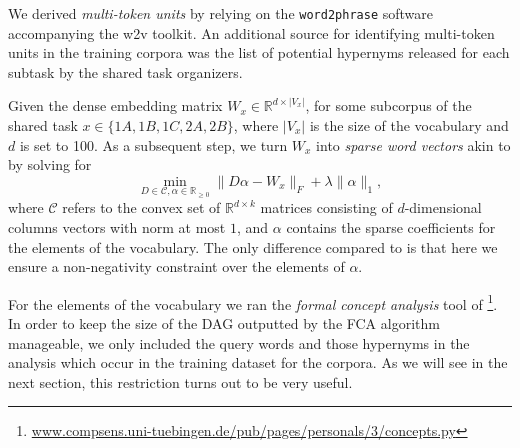 \documentclass[11pt,a4paper]{article}
\begin{document}
We derived \emph{multi-token units} by relying on the \texttt{word2phrase} 
software accompanying the w2v toolkit. An additional source for identifying 
multi-token units in the training corpora was the list of potential hypernyms 
released for each subtask by the shared task organizers.

Given the dense embedding matrix $W_x \in \mathbb{R}^{d \times \lvert V_x
\rvert}$, 
for some subcorpus of the shared task $x\in\{1A, 1B, 1C, 2A, 2B\}$, 
where $\lvert V_x \rvert$ is the size of the vocabulary and $d$ is set
to 100. As a subsequent step, we turn $W_x$ into
\emph{sparse word vectors} akin to \citet{Berend:2017} by solving for
\begin{equation}
\min\limits_{D \in \mathcal{C}, \alpha \in \mathbb{R}_{\geq0}} \lVert D\alpha - W_{x} \rVert_F + \lambda \lVert \alpha \rVert_1,
\label{nonneg_SPAMS_objective}
\end{equation}
where $\mathcal{C}$ refers to the convex set of $\mathbb{R}^{ d \times k}$ 
matrices consisting of $d$-dimensional columns vectors
with norm at most $1$, and $\alpha$ contains the sparse coefficients for the elements of the vocabulary. The only difference
compared to \citet{Berend:2017} is that here we ensure a non-negativity
constraint over the elements of $\alpha$.

For the elements of the vocabulary we ran the \emph{formal concept analysis} tool of
\citet{Endres:2010}\footnote{\url{www.compsens.uni-tuebingen.de/pub/pages/personals/3/concepts.py}}.
In order to keep the size of the DAG outputted by the FCA algorithm manageable,
we only included the query words and those hypernyms in the analysis which
occur in the training dataset for the corpora.
As we will see in the next section, this restriction turns out to be very useful.
\end{document}
